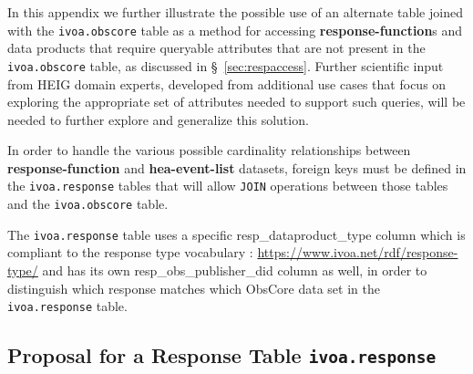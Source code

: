 In this appendix we further illustrate the possible use of an alternate table joined with the {\tt ivoa.obscore} table as a method for accessing {\bf response-function}s and data products that require queryable attributes that are not present in the {\tt ivoa.obscore} table,  as discussed in \S~\ref{sec:respaccess}. Further scientific input from \gls{HEIG} domain experts, developed from additional use cases that focus on exploring the appropriate set of attributes needed to support such queries, will be needed to further explore and generalize this solution.

In order to handle the various possible cardinality relationships between {\bf response-function} and {\bf hea-event-list}  datasets, foreign keys must be defined in the {\tt ivoa.response} tables that will allow {\tt  JOIN} operations between those tables and the {\tt ivoa.obscore} table.

The {\tt ivoa.response} table uses a specific resp\_dataproduct\_type column which is compliant to the response type vocabulary : \scriptsize{\url{https://www.ivoa.net/rdf/response-type/}} and has its own resp\_obs\_publisher\_did column as well, in order to distinguish which response matches  which ObsCore data set in the {\tt ivoa.response} table. 

\subsection*{Proposal for a Response Table {\tt ivoa.response}}

